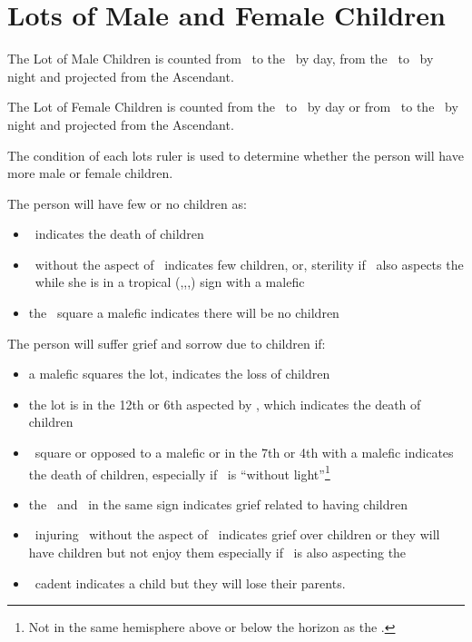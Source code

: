 \section{Lots of Male and Female Children}
The Lot of Male Children is counted from \Jupiter\, to the \Sun\, by day, from the \Sun\, to \Jupiter\, by night and projected from the Ascendant.

The Lot of Female Children is counted from the \Moon\, to \Venus\, by day or from \Venus\, to the \Moon\, by night and projected from the Ascendant.

The condition of each lots ruler is used to determine whether the person will have more male or female children.

The person will have few or no children as:
\begin{itemize}[topsep=0em,itemsep=0em]
\item \Saturn\Opposition\Mercury\, indicates the death of children
\item \Venus\Opposition\Saturn\, without the aspect of \Jupiter\, indicates few children, or, sterility if \Saturn\, also aspects the \Moon\, while she is in a tropical (\Aries,\Cancer,\Libra,\Capricorn) sign with a malefic
\item the \Moon\, square a malefic indicates there will be no children
\end{itemize}

The person will suffer grief and sorrow due to children if:
\begin{itemize}[topsep=0em,itemsep=0em]
\item a malefic squares the lot, indicates the loss of children
\item the lot is in the 12th or 6th aspected by \Saturn, which indicates the death of children
\item \Jupiter\, square or opposed to a malefic or in the 7th or 4th with a malefic indicates the death of children, especially if \Jupiter\, is ``without light''\footnote{Not in the same hemisphere above or below the horizon as the \Sun.}
\item the \Sun\, and \Saturn\, in the same sign indicates grief related to having children
\item \Saturn\, injuring \Venus\, without the aspect of \Jupiter\, indicates grief over children or they will have children but not enjoy them especially if \Saturn\, is also aspecting the \Moon
\item \Jupiter\, cadent indicates a child but they will lose their parents.
\end{itemize}

